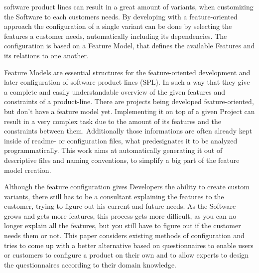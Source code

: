 % 
% 
% 
% 
 software product lines can result in a great amount of variants, when customizing the Software to each customers needs. By developing with a feature-oriented approach the configuration of a single variant can be done by selecting the features a customer needs, automatically including its dependencies. The configuration is based on a Feature Model, that defines the available Features and its relations to one another.

Feature Models are essential structures for the feature-oriented development and later configuration of software product lines (SPL). In such a way that they give a complete and easily understandable overview of the given features and constraints of a product-line. There are projects being developed feature-oriented, but don't have a feature model yet. Implementing it on top of a given Project can result in a very complex task due to the amount of its features and the constraints between them. Additionally those informations are often already kept inside of readme- or configuration files, what predesignates it to be analyzed programmatically. This work aims at automatically generating it out of descriptive files and naming conventions, to simplify a big part of the feature model creation.

Although the feature configuration gives  Developers the ability to create custom variants, there still has to be a consultant explaining the features to the customer, trying to figure out his current and future needs. As the Software grows and gets more features, this process gets more difficult, as you can no longer explain all the features, but you still have to figure out if the customer needs them or not. This paper considers existing methods of configuration and tries to come up with a better alternative based on questionnaires to enable users or customers to configure a product on their own and to allow experts to design the questionnaires according to their domain knowledge.
 
